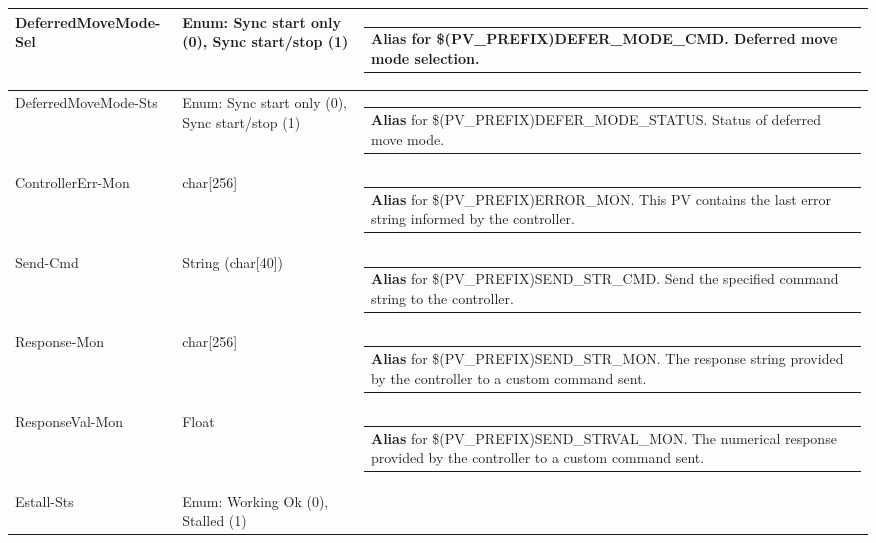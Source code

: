 \documentclass[openany]{article}
\begin{document}
\begin{longtable}{| m{4.5cm} m{2.5cm}  m{8.5cm} |}
        DeferredMoveMode-Sel & Enum: Sync start only (0), Sync start/stop (1) & \begin{tabular}{@{}m{6cm}@{}}
                \textbf{\color{blue} Alias} for \$(PV\_PREFIX)DEFER\_MODE\_CMD. Deferred move mode selection.
            \end{tabular} \hypertarget{}{}\\ \hline
        DeferredMoveMode-Sts & Enum: Sync start only (0), Sync start/stop (1) & \begin{tabular}{@{}m{6cm}@{}}
                \textbf{\color{blue} Alias} for \$(PV\_PREFIX)DEFER\_MODE\_STATUS. Status of deferred move mode.
            \end{tabular} \hypertarget{pv:controller-err-mon}{}\\ \hline
        ControllerErr-Mon & char[256] & \begin{tabular}{@{}m{6cm}@{}}
                \textbf{\color{blue} Alias} for \$(PV\_PREFIX)ERROR\_MON. This PV contains the last error string informed by the controller.
            \end{tabular} \hypertarget{pv:send-cmd}{}\\ \hline
        Send-Cmd & String (char[40]) & \begin{tabular}{@{}m{6cm}@{}}
                \textbf{\color{blue} Alias} for \$(PV\_PREFIX)SEND\_STR\_CMD. Send the specified command string to the controller.
            \end{tabular} \hypertarget{pv:response-mon}{}\\ \hline
        Response-Mon & char[256] & \begin{tabular}{@{}m{6cm}@{}}
                \textbf{\color{blue} Alias} for \$(PV\_PREFIX)SEND\_STR\_MON. The response string provided by the controller to a custom command sent.
            \end{tabular} \hypertarget{pv:response-val-mon}{}\\ \hline
        ResponseVal-Mon & Float & \begin{tabular}{@{}m{6cm}@{}}
                \textbf{\color{blue} Alias} for \$(PV\_PREFIX)SEND\_STRVAL\_MON. The numerical response provided by the controller to a custom command sent.
            \end{tabular} \hypertarget{pv:estall}{}\\ \hline
        Estall-Sts & Enum: Working Ok (0), Stalled (1) & \begin{tabular}{@{}m{6cm}@{}}

\end{tabular}
\end{longtable}
\end{document}
